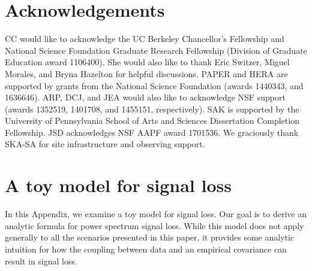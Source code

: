 \documentclass[preprint2,numberedappendix,tighten]{aastex6}  %
\begin{document}

\section{Acknowledgements}
CC would like to acknowledge the UC Berkeley Chancellor's Fellowship and National Science Foundation Graduate Research 
Fellowship (Division of Graduate Education award 1106400). She would also like to thank Eric Switzer, Miguel Morales, and Bryna Hazelton for helpful discussions. PAPER and HERA 
are supported by grants from the National Science Foundation (awards 1440343, and 1636646). ARP, DCJ, and JEA would 
also like to acknowledge NSF support (awards 1352519, 1401708, and 1455151, respectively). SAK is supported by the University of Pennsylvania School of Arts and Sciences Dissertation Completion Fellowship. JSD acknowledges NSF AAPF
award 1701536. We graciously thank SKA-SA for site infrastructure and observing support.
\label{sec:Ack}


\appendix
\section{A toy model for signal loss}
\label{sec:sigloss_appendix}

In this Appendix, we examine a toy model for signal loss. Our goal is to derive an analytic formula for power spectrum signal loss. While this 
model does not apply generally to all the scenarios presented in this paper, it provides some analytic intuition for how the coupling between data and an empirical covariance can result in signal loss.
\end{document}
